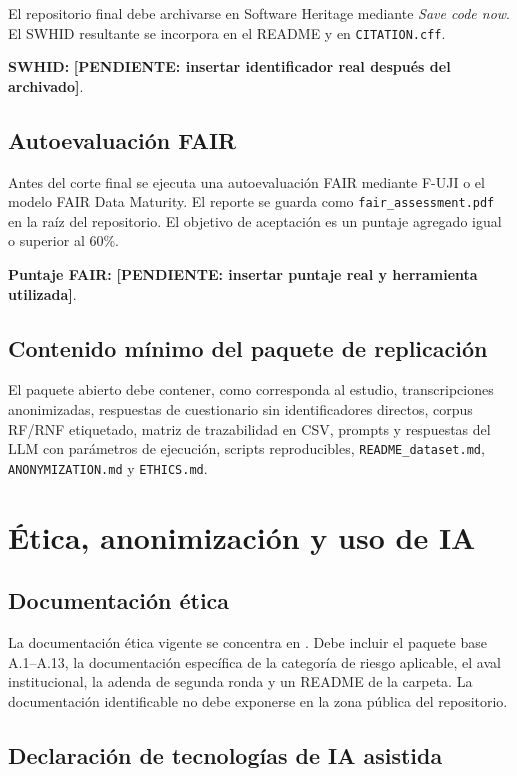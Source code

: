 \documentclass[12pt,journal,onecolumn]{IEEEtran}
\newcommand{\pendiente}[1]{\textcolor{red!70!black}{\textbf{[PENDIENTE: #1]}}}
\begin{document}
El repositorio final debe archivarse en Software Heritage mediante
\emph{Save code now}. El SWHID resultante se incorpora en el README y en
\texttt{CITATION.cff}.

\textbf{SWHID:}
\pendiente{insertar identificador real después del archivado}.

\subsection{Autoevaluación FAIR}

Antes del corte final se ejecuta una autoevaluación FAIR mediante F-UJI o el
modelo FAIR Data Maturity. El reporte se guarda como
\texttt{fair\_assessment.pdf} en la raíz del repositorio. El objetivo de
aceptación es un puntaje agregado igual o superior al 60\%.

\textbf{Puntaje FAIR:}
\pendiente{insertar puntaje real y herramienta utilizada}.

\subsection{Contenido mínimo del paquete de replicación}

El paquete abierto debe contener, como corresponda al estudio, transcripciones
anonimizadas, respuestas de cuestionario sin identificadores directos, corpus
RF/RNF etiquetado, matriz de trazabilidad en CSV, prompts y respuestas del LLM
con parámetros de ejecución, scripts reproducibles,
\texttt{README\_dataset.md}, \texttt{ANONYMIZATION.md} y \texttt{ETHICS.md}.

\section{Ética, anonimización y uso de IA}
\label{sec:etica_ia_2b}

\subsection{Documentación ética}

La documentación ética vigente se concentra en . Debe incluir
el paquete base A.1--A.13, la documentación específica de la categoría de
riesgo aplicable, el aval institucional, la adenda de segunda ronda y un
README de la carpeta. La documentación identificable no debe exponerse en la
zona pública del repositorio.

\subsection{Declaración de tecnologías de IA asistida}
\end{document}
